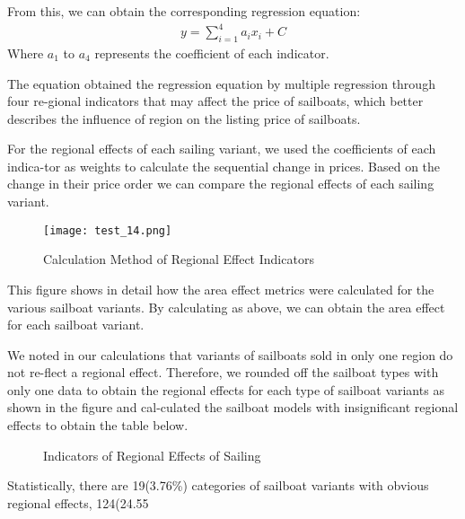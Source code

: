 From this, we can obtain the corresponding regression equation:
\begin{align}
    y=\sum_{i=1}^4{a_ix_i+C}
\end{align}
Where $a_1$ to $a_4$ represents the coefficient of each indicator.

The equation obtained the regression equation by multiple regression through four re-gional indicators that may affect the price of sailboats, which better describes the influence of region on the listing price of sailboats.

For the regional effects of each sailing variant, we used the coefficients of each indica-tor as weights to calculate the sequential change in prices. Based on the change in their price order we can compare the regional effects of each sailing variant.

\begin{figure}[H]  %
    \centering  %
    \texttt{[image: test\_14.png]} %
    \caption{ Calculation Method of Regional Effect Indicators} %
    \vspace{-0.5cm}
\end{figure}

This figure shows in detail how the area effect metrics were calculated for the various sailboat variants. By calculating as above, we can obtain the area effect for each sailboat variant.

We noted in our calculations that variants of sailboats sold in only one region do not re-flect a regional effect. Therefore, we rounded off the sailboat types with only one data to obtain the regional effects for each type of sailboat variants as shown in the figure and cal-culated the sailboat models with insignificant regional effects to obtain the table below.
\vspace{-0.5cm}
\begin{figure}[H]
    \centering    
	\caption{Indicators of Regional Effects of Sailing} %
\end{figure}
\vspace{-0.5cm}
Statistically, there are 19(3.76\%) categories of sailboat variants with obvious regional effects, 124(24.55%

